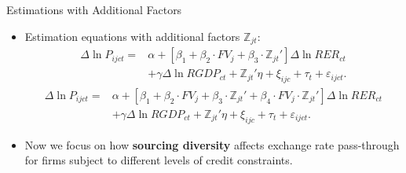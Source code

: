 \documentclass[10pt]{beamer}
\begin{document}
\begin{frame}{Estimations with Additional Factors}
	\begin{itemize}
		\item Estimation equations with additional factors $\mathbb{Z}_{jt}$:
		\begin{equation}
			\begin{aligned}
				\Delta \ln P_{ijct}=&\alpha+[\beta_{1}+ \beta_{2} \cdot FV_{j}+\beta_{3} \cdot {\mathbb{Z}_{jt}}'] \Delta \ln RER_{ct} \\&+\gamma \Delta \ln RGDP_{ct}+ {\mathbb{Z}_{jt}}' \eta+\xi_{ijc}+\tau_{t} +\varepsilon_{ijct}.
			\end{aligned}	
			\label{eq.add.control}
		\end{equation}
		\begin{equation}
			\begin{aligned}
				\Delta \ln P_{ijct}=&\alpha+[\beta_{1}+ \beta_{2} \cdot FV_{j}+\beta_{3} \cdot {\mathbb{Z}_{jt}}'+\beta_{4} \cdot FV_{j} \cdot {\mathbb{Z}_{jt}}'] \Delta \ln RER_{ct} \\ &+\gamma \Delta \ln RGDP_{ct}+ {\mathbb{Z}_{jt}}' \eta+\xi_{ijc}+\tau_{t} +\varepsilon_{ijct}.
			\end{aligned}	
			\label{eq.add.interaction}
		\end{equation}
		\item Now we focus on how \textbf{sourcing diversity} affects exchange rate pass-through for firms subject to different levels of credit constraints.
	\end{itemize}
\end{frame}
\end{document}
